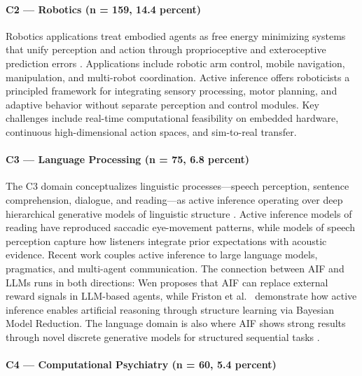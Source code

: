 \documentclass[
  english,
]{article}
\begin{document}
\paragraph{C2 --- Robotics (n = 159, 14.4
percent)}\label{c2-robotics-n-159-14.4-percent}

Robotics applications treat embodied agents as free energy minimizing
systems that unify perception and action through proprioceptive and
exteroceptive prediction errors \citep{lanillos2021active}. Applications
include robotic arm control, mobile navigation, manipulation, and
multi-robot coordination. Active inference offers roboticists a
principled framework for integrating sensory processing, motor planning,
and adaptive behavior without separate perception and control modules.
Key challenges include real-time computational feasibility on embedded
hardware, continuous high-dimensional action spaces, and sim-to-real
transfer.

\paragraph{C3 --- Language Processing (n = 75, 6.8
percent)}\label{c3-language-processing-n-75-6.8-percent}

The C3 domain conceptualizes linguistic processes---speech perception,
sentence comprehension, dialogue, and reading---as active inference
operating over deep hierarchical generative models of linguistic
structure \citep{friston2020generative}. Active inference models of
reading have reproduced saccadic eye-movement patterns, while models of
speech perception capture how listeners integrate prior expectations
with acoustic evidence. Recent work couples active inference to large
language models, pragmatics, and multi-agent communication. The
connection between AIF and LLMs runs in both directions: Wen
\citep{wen2025missing} proposes that AIF can replace external reward
signals in LLM-based agents, while Friston et
al.~\citep{friston2025active} demonstrate how active inference enables
artificial reasoning through structure learning via Bayesian Model
Reduction. The language domain is also where AIF shows strong results
through novel discrete generative models for structured sequential tasks
\citep{millidge2024retrospective}.

\paragraph{C4 --- Computational Psychiatry (n = 60, 5.4
percent)}\label{c4-computational-psychiatry-n-60-5.4-percent}
\end{document}
